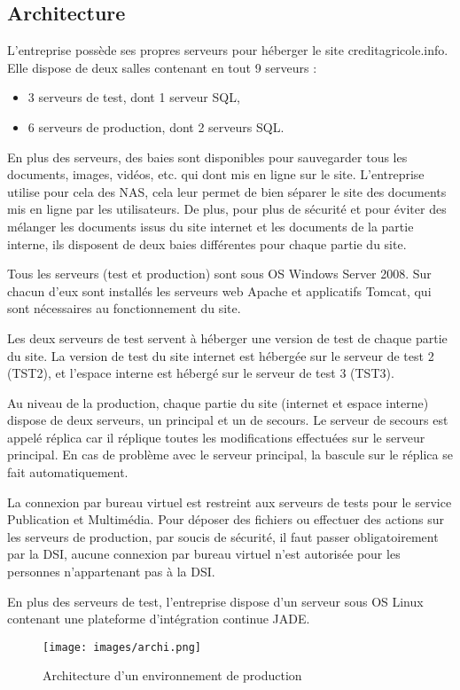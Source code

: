 \documentclass[12pt,a4paper]{article}
\begin{document}
\subsection{Architecture}
L'entreprise possède ses propres serveurs pour héberger le site creditagricole.info. Elle dispose de deux salles contenant en tout 9 serveurs :
\begin{itemize}
\item 3 serveurs de test, dont 1 serveur SQL,
\item 6 serveurs de production, dont 2 serveurs SQL.
\end{itemize}
En plus des serveurs, des baies sont disponibles pour sauvegarder tous les documents, images, vidéos, etc. qui dont mis en ligne sur le site. L'entreprise utilise pour cela des NAS, cela leur permet de bien séparer le site des documents mis en ligne par les utilisateurs. De plus, pour plus de sécurité et pour éviter des mélanger les documents issus du site internet et les documents de la partie interne, ils disposent de deux baies différentes pour chaque partie du site.\par
\medskip
Tous les serveurs (test et production) sont sous OS Windows Server 2008. Sur chacun d'eux sont installés les serveurs web Apache et applicatifs Tomcat, qui sont nécessaires au fonctionnement du site.\par
Les deux serveurs de test servent à héberger une version de test de chaque partie du site. La version de test du site internet est hébergée sur le serveur de test 2 (TST2), et l'espace interne est hébergé sur le serveur de test 3 (TST3).\par
Au niveau de la production, chaque partie du site (internet et espace interne) dispose de deux serveurs, un principal et un de secours. Le serveur de secours est appelé réplica car il réplique toutes les modifications effectuées sur le serveur principal. En cas de problème avec le serveur principal, la bascule sur le réplica se fait automatiquement.\par
La connexion par bureau virtuel est restreint aux serveurs de tests pour le service Publication et Multimédia. Pour déposer des fichiers ou effectuer des actions sur les serveurs de production, par soucis de sécurité, il faut passer obligatoirement par la DSI, aucune connexion par bureau virtuel n'est autorisée pour les personnes n'appartenant pas à la DSI.\par
\medskip
En plus des serveurs de test, l'entreprise dispose d'un serveur sous OS Linux contenant une plateforme d'intégration continue \gls{JADE}. 
\begin{figure}[h!]
\centering
\texttt{[image: images/archi.png]} 
\caption{Architecture d'un environnement de production}
\end{figure}
\end{document}
